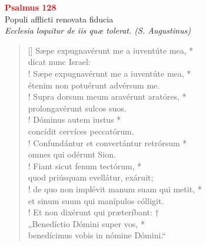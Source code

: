 


\def\greinitialformat#1{%
{\fontsize{39}{39}\selectfont #1}%
}




\vspace{0.3cm}
\begin{center}
 \textcolor{red}{\large \bf Psalmus 128}\\
Populi afflicti renovata fiducia\\
\textit{\small Ecclesia loquitur de iis quæ tolerat. (S. Augustinus)}
\end{center}
\begin{verse}[\versewidth]
Sæpe expugnavérunt me a iuventúte mea, *\\
dicat nunc Israel:\\!
\vin Sæpe expugnavérunt me a iuventúte mea, *\\
\vin étenim non potuérunt advérsum me.\\!
Supra dorsum meum aravérunt aratóres, *\\
prolongavérunt sulcos suos.\\!
\vin Dóminus autem iustus *\\
\vin concídit cervíces peccatórum.\\!
Confundántur et convertántur retrórsum *\\
omnes qui odérunt Sion.\\!
\vin Fiant sicut fenum tectórum, *\\
\vin quod priúsquam evellátur, exáruit;\\!
de quo non implévit manum suam qui metit, *\\
et sinum suum qui manípulos cólligit.\\!
\vin Et non dixérunt qui præteríbant: †\\
\vin „Benedíctio Dómini super vos, *\\
\vin benedícimus vobis in nómine Dómini.“\\
\end{verse}
\vspace{1cm}



